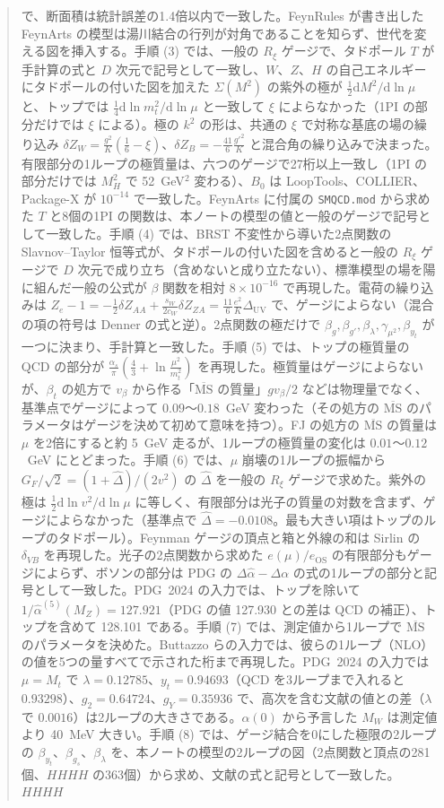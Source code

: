 \documentclass[a4paper,10pt]{ltjsarticle}
\newcommand{\dd}{\mathrm{d}}
\newcommand{\MSbar}{\overline{\mathrm{MS}}}
\newcommand{\DUV}{\Delta_{\mathrm{UV}}}
\begin{document}
\begin{abstract}
で、断面積は統計誤差の1.4倍以内で一致した。FeynRules が書き出した FeynArts の模型は湯川結合の行列が対角であることを知らず、世代を変える図を挿入する。手順 (3) では、一般の $R_\xi$ ゲージで、タドポール $T$ が手計算の式と $D$ 次元で記号として一致し、$W$、$Z$、$H$ の自己エネルギーにタドポールの付いた図を加えた $\Sigma(M^2)$ の紫外の極が $\frac12\dd M^2/\dd\ln\mu$ と、トップでは $\frac14\dd\ln m_t^2/\dd\ln\mu$ と一致して $\xi$ によらなかった（1PI の部分だけでは $\xi$ による）。極の $k^2$ の形は、共通の $\xi$ で対称な基底の場の繰り込み $\delta Z_W=\frac{g^2}K(\frac16-\xi)$、$\delta Z_B=-\frac{41}6\frac{g'^2}K$ と混合角の繰り込みで決まった。有限部分の1ループの極質量は、六つのゲージで27桁以上一致し（1PI の部分だけでは $M_H^2$ で 52~GeV$^2$ 変わる）、$B_0$ は LoopTools、COLLIER、Package-X が $10^{-14}$ で一致した。FeynArts に付属の \texttt{SMQCD.mod} から求めた $T$ と8個の1PI の関数は、本ノートの模型の値と一般のゲージで記号として一致した。手順 (4) では、BRST 不変性から導いた2点関数の Slavnov--Taylor 恒等式が、タドポールの付いた図を含めると一般の $R_\xi$ ゲージで $D$ 次元で成り立ち（含めないと成り立たない）、標準模型の場を陽に組んだ一般の公式が $\beta$ 関数を相対 $8\times10^{-16}$ で再現した。電荷の繰り込みは $Z_e-1=-\frac12\delta Z_{AA}+\frac{s_W}{2c_W}\delta Z_{ZA}=\frac{11}6\frac{e^2}{K}\DUV$ で、ゲージによらない（混合の項の符号は Denner の式と逆）。2点関数の極だけで $\beta_g,\beta_{g'},\beta_\lambda,\gamma_{\mu^2},\beta_{y_t}$ が一つに決まり、手計算と一致した。手順 (5) では、トップの極質量の QCD の部分が $\frac{\alpha_s}\pi(\frac43+\ln\frac{\mu^2}{m_t^2})$ を再現した。極質量はゲージによらないが、$\beta_t$ の処方で $v_\beta$ から作る「$\MSbar$ の質量」$gv_\beta/2$ などは物理量でなく、基準点でゲージによって $0.09$〜$0.18$~GeV 変わった（その処方の $\MSbar$ のパラメータはゲージを決めて初めて意味を持つ）。FJ の処方の $\MSbar$ の質量は $\mu$ を2倍にすると約 5~GeV 走るが、1ループの極質量の変化は $0.01$〜$0.12$~GeV にとどまった。手順 (6) では、$\mu$ 崩壊の1ループの振幅から $G_F/\sqrt2=(1+\hat\Delta)/(2v^2)$ の $\hat\Delta$ を一般の $R_\xi$ ゲージで求めた。紫外の極は $\frac12\dd\ln v^2/\dd\ln\mu$ に等しく、有限部分は光子の質量の対数を含まず、ゲージによらなかった（基準点で $\hat\Delta=-0.0108$。最も大きい項はトップのループのタドポール）。Feynman ゲージの頂点と箱と外線の和は Sirlin の $\delta_{VB}$ を再現した。光子の2点関数から求めた $e(\mu)/e_{\mathrm{OS}}$ の有限部分もゲージによらず、ボソンの部分は PDG の $\Delta\hat\alpha-\Delta\alpha$ の式の1ループの部分と記号として一致した。PDG~2024 の入力では、トップを除いて $1/\hat\alpha^{(5)}(M_Z)=127.921$（PDG の値 127.930 との差は QCD の補正）、トップを含めて 128.101 である。手順 (7) では、測定値から1ループで $\MSbar$ のパラメータを決めた。Buttazzo らの入力では、彼らの1ループ（NLO）の値を5つの量すべてで示された桁まで再現した。PDG~2024 の入力では $\mu=M_t$ で $\lambda=0.12785$、$y_t=0.94693$（QCD を3ループまで入れると $0.93298$）、$g_2=0.64724$、$g_Y=0.35936$ で、高次を含む文献の値との差（$\lambda$ で $0.0016$）は2ループの大きさである。$\alpha(0)$ から予言した $M_W$ は測定値より 40~MeV 大きい。手順 (8) では、ゲージ結合を0にした極限の2ループの $\beta_{y_t}$、$\beta_{g_s}$、$\beta_\lambda$ を、本ノートの模型の2ループの図（2点関数と頂点の281個、$HHHH$ の363個）から求め、文献の式と記号として一致した。$HHHH$ 
\end{abstract}
\end{document}

